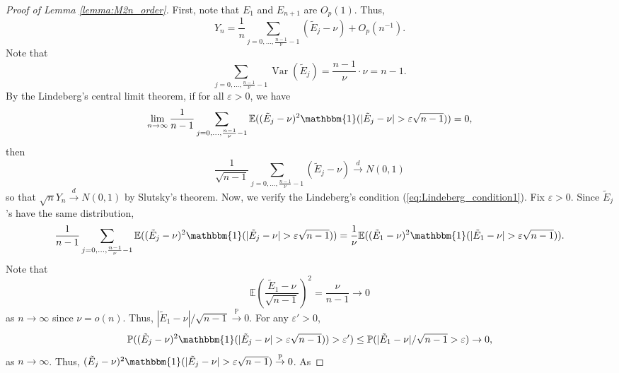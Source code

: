 \documentclass[12pt,letterpaper, twoside, openany]{article}
\DeclareMathOperator*{\Var}{Var}
\theoremstyle{plain}
\begin{document}
\begin{proof}[Proof of Lemma \ref{lemma:M2n_order}]
First, note that $E_1$ and $E_{n+1}$ are $O_p(1)$. Thus,
\begin{equation*}
	Y_n = \frac{1}{n} \sum_{j=0,\ldots,\frac{n-1}{\nu}-1} (\tilde{E}_j - \nu) + O_p(n^{-1}).
\end{equation*}
Note that
\begin{equation*}
	\sum_{j=0,\ldots,\frac{n-1}{\nu}-1} \Var(\tilde{E}_j) = \frac{n-1}{\nu} \cdot \nu = n-1.
\end{equation*}
By the Lindeberg's central limit theorem, if for all $\varepsilon > 0$, we have
\begin{equation}\label{eq:Lindeberg_condition1}
	\lim_{n\rightarrow \infty} \frac{1}{n-1}\sum_{j=0,\ldots, \frac{n-1}{\nu}-1} \mathbb{E}((\tilde{E}_j - \nu)^2 \mathbbm{1}(|\tilde{E}_j - \nu| > \varepsilon \sqrt{n-1})) = 0,
\end{equation}
then 
\begin{equation*}
	\frac{1}{\sqrt{n-1}} \sum_{j=0,\ldots,\frac{n-1}{\nu}-1}(\tilde{E}_j - \nu) \stackrel{d}{\rightarrow} N(0, 1)
\end{equation*}
so that $\sqrt{n}Y_n \stackrel{d}{\rightarrow} N(0, 1)$ by Slutsky's theorem. Now, we verify the Lindeberg's condition (\ref{eq:Lindeberg_condition1}). Fix $\varepsilon  >0$.  Since $\tilde{E}_j$'s have the same distribution,
\begin{align*}
	 \frac{1}{n-1}\sum_{j=0,\ldots, \frac{n-1}{\nu}-1} \mathbb{E}((\tilde{E}_j - \nu)^2 \mathbbm{1}(|\tilde{E}_j - \nu| > \varepsilon \sqrt{n-1})) 
= \frac{1}{\nu}\mathbb{E}((\tilde{E}_1 - \nu)^2 \mathbbm{1}(|\tilde{E}_1 - \nu| > \varepsilon \sqrt{n-1})).
\end{align*}
Note that
\begin{equation*}
	\mathbb{E}\left( \frac{\tilde{E}_1-\nu}{\sqrt{n-1}}\right)^2 = \frac{\nu}{n-1} \rightarrow 0
\end{equation*}
as $n \rightarrow \infty$ since $\nu = o(n)$. Thus, $|\tilde{E}_1 - \nu|/\sqrt{n-1} \stackrel{\mathbb{P}}{\rightarrow} 0$. For any $\varepsilon' > 0$,
\begin{equation*}
	\mathbb{P}((\tilde{E}_j - \nu)^2\mathbbm{1}(|\tilde{E}_j - \nu| > \varepsilon \sqrt{n-1})) > \varepsilon') \leq \mathbb{P}(|\tilde{E}_1-\nu|/\sqrt{n-1} > \varepsilon) \rightarrow 0,
\end{equation*}
as $n \rightarrow \infty$. Thus, $(\tilde{E}_j - \nu)^2\mathbbm{1}(|\tilde{E}_j - \nu| > \varepsilon \sqrt{n-1}) \stackrel{\mathbb{P}}{\rightarrow} 0$. As

\end{proof}
\end{document}
